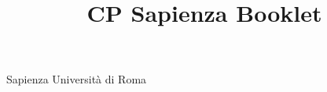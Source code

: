 \documentclass[9pt, a4paper, notitlepage]{extreport}
\title{CP Sapienza Booklet}
\begin{document}
\begin{multicols*}{3}

\begin{center}
  \huge Sapienza Università di Roma
  \vspace{1.5em}
\end{center}

\tableofcontents
\vfill\null
\columnbreak











\end{multicols*}
\end{document}
